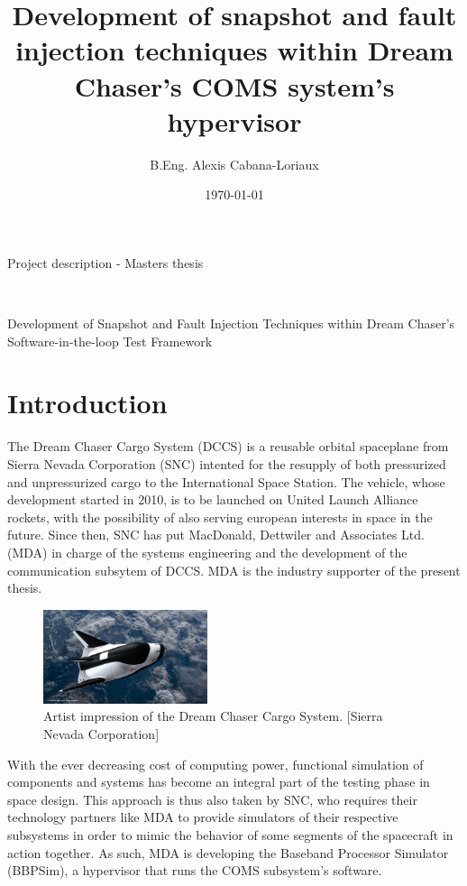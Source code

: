 \documentclass[12pt,english]{rftthesis}
\title           {Development of snapshot and fault injection techniques within Dream Chaser's COMS system's hypervisor}
\author          {B.Eng. Alexis Cabana-Loriaux}
\date            {\today}
\begin{document}
\onehalfspacing

%
%
\begin{center}
\begin{large}
Project description - Masters thesis
\end{large}
\\
\vspace{.5cm}
\begin{LARGE}
Development of Snapshot and Fault Injection Techniques within Dream Chaser's Software-in-the-loop Test Framework
\end{LARGE}
\end{center}

%
%
\section*{Introduction}\label{sec:intro}
The Dream Chaser Cargo System (DCCS) is a reusable orbital spaceplane from Sierra Nevada Corporation (SNC) intented for the resupply of both pressurized and unpressurized cargo to the International Space Station. The vehicle, whose development started in 2010, is to be launched on United Launch Alliance rockets, with the possibility of also serving european interests in space in the future. Since then, SNC has put MacDonald, Dettwiler and Associates Ltd. (MDA) in charge of the systems engineering and the development of the communication subsytem of DCCS. MDA is the industry supporter of the present thesis.

\begin{figure}
\centering
\includegraphics[width=0.43\textwidth]{art/dccs}
\caption{\label{fig:dccs}Artist impression of the Dream Chaser Cargo System. [Sierra Nevada Corporation]}
\end{figure}

With the ever decreasing cost of computing power, functional simulation of components and systems has become an integral part of the testing phase in space design. This approach is thus also taken by SNC, who requires their technology partners like MDA to provide simulators of their respective subsystems in order to mimic the behavior of some segments of the spacecraft in action together. As such, MDA is developing the Baseband Processor Simulator (BBPSim), a hypervisor that runs the COMS subsystem's software.
\end{document}
